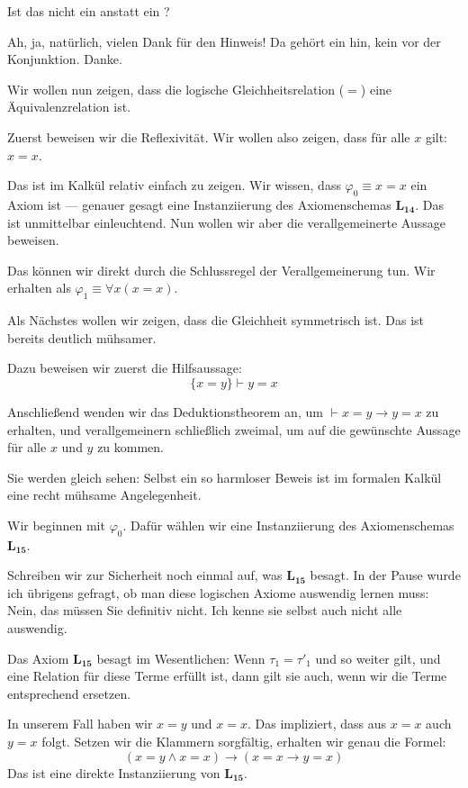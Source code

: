 \begin{student-interaction}[Studentenfrage]
Ist das nicht ein  anstatt ein ?
\end{student-interaction}

\begin{spoken-clean}[continued]
Ah, ja, natürlich, vielen Dank für den Hinweis! Da gehört ein  hin, kein  vor der Konjunktion. Danke. 

Wir wollen nun zeigen, dass die logische Gleichheitsrelation ($=$) eine Äquivalenzrelation ist. 

Zuerst beweisen wir die Reflexivität. Wir wollen also zeigen, dass für alle $x$ gilt: $x = x$. 

Das ist im Kalkül relativ einfach zu zeigen. Wir wissen, dass $\varphi_0 \equiv x = x$ ein Axiom ist --- genauer gesagt eine Instanziierung des Axiomenschemas $\mathbf{L_{14}}$. Das ist unmittelbar einleuchtend. Nun wollen wir aber die verallgemeinerte Aussage beweisen. 

Das können wir direkt durch die Schlussregel der Verallgemeinerung tun. Wir erhalten als $\varphi_1 \equiv \forall x (x = x)$. 

Als Nächstes wollen wir zeigen, dass die Gleichheit symmetrisch ist. Das ist bereits deutlich mühsamer. 

Dazu beweisen wir zuerst die Hilfsaussage:
\[ \{x = y\} \vdash y = x \]

Anschließend wenden wir das Deduktionstheorem an, um $\vdash x = y \rightarrow y = x$ zu erhalten, und verallgemeinern schließlich zweimal, um auf die gewünschte Aussage für alle $x$ und $y$ zu kommen. 

Sie werden gleich sehen: Selbst ein so harmloser Beweis ist im formalen Kalkül eine recht mühsame Angelegenheit.
\end{spoken-clean}

\begin{spoken-clean}[00:55:04 - 00:57:34]
Wir beginnen mit $\varphi_0$. Dafür wählen wir eine Instanziierung des Axiomenschemas $\mathbf{L_{15}}$. 

Schreiben wir zur Sicherheit noch einmal auf, was $\mathbf{L_{15}}$ besagt. In der Pause wurde ich übrigens gefragt, ob man diese logischen Axiome auswendig lernen muss: Nein, das müssen Sie definitiv nicht. Ich kenne sie selbst auch nicht alle auswendig. 

Das Axiom $\mathbf{L_{15}}$ besagt im Wesentlichen: Wenn $\tau_1 = \tau'_1$ und so weiter gilt, und eine Relation für diese Terme erfüllt ist, dann gilt sie auch, wenn wir die Terme entsprechend ersetzen. 

In unserem Fall haben wir $x = y$ und $x = x$. Das impliziert, dass aus $x = x$ auch $y = x$ folgt. Setzen wir die Klammern sorgfältig, erhalten wir genau die Formel:
\[ (x = y \wedge x = x) \rightarrow (x = x \rightarrow y = x) \]
Das ist eine direkte Instanziierung von $\mathbf{L_{15}}$.
\end{spoken-clean}


